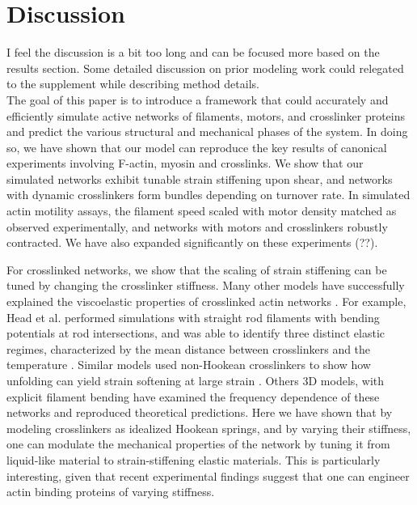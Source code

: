 \documentclass[11pt]{article}
\begin{document}
\section*{Discussion}
{\color{blue} I feel the discussion is a bit too long and can be focused more based on the results section. Some detailed discussion on prior modeling work could relegated to the supplement while describing method details.}\\
The goal of this paper is to introduce a framework that could accurately and efficiently simulate active 
networks of {\color{red}filaments, motors}, and crosslinker proteins {\color{red}and predict} the various structural {\color{red}and mechanical} phases 
{\color{red}of the system}. In doing so, we have shown that our model can reproduce the key results of 
canonical {\color{red}{\it in vitro}} experiments {\color{red}involving F-actin, myosin and crosslinks}. {\color{red}We show that our} simulated networks {\color{red}exhibit tunable} strain stiffening {\color{red}upon shear}, and networks with dynamic crosslinkers
form bundles {\color{red}depending on turnover rate}. In simulated {\color{red}actin} motility assays, the filament speed scaled with motor density matched as observed experimentally, and networks with motors and crosslinkers robustly contracted. 
We have also expanded significantly on these experiments {\color{blue}(??)}. 

\par
For crosslinked networks, we show that the scaling of strain stiffening can be tuned by 
changing the crosslinker stiffness. Many other models have successfully {\color{red}explained} the 
viscoelastic properties of crosslinked actin networks \cite{mackintosh1995, head2003, wilhelm2003, kim2009}.  
For example, Head et al. {\color{red}performed simulations} with straight rod filaments with bending potentials at rod intersections, and was able to identify three {\color{red}distinct} elastic regimes,
characterized by the mean distance between crosslinkers and the temperature \cite{head2003}. Similar models used non-Hookean crosslinkers to show how unfolding can yield strain softening at large strain \cite{didonna2007}. Others 3D models, with explicit filament bending have examined the frequency dependence of these networks and reproduced theoretical predictions\cite{gittes1998,kim2009,muller2014}.
{\color{red}Here} we have shown that by modeling crosslinkers as idealized Hookean springs, 
and {\color{red}by} varying their stiffness, one can modulate the {\color{red}mechanical properties of the network by tuning it from liquid-like material to strain-stiffening elastic materials}. 
This is particularly interesting, given that recent experimental findings suggest that one can engineer 
actin binding proteins of varying stiffness\cite{vieregg2016}.  
\end{document}
